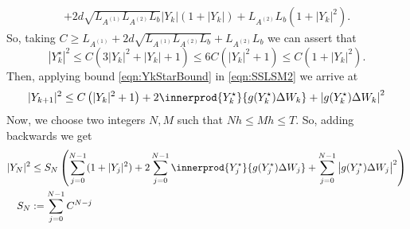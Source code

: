 \begin{pf}
\begin{align*}
			+ 2 d \sqrt{L_{A^{(1)}} L_{A^{(2)}} L_b }|Y_k|(1+|Y_k|)
			+L_{A^{(2)}} L_b (1+|Y_k|^2).
	\end{align*}
	So, taking $C \geq L_{A^{(1)}}+ 2 d \sqrt{L_{A^{(1)}} L_{A^{(2)}} L_b} + L_{A^{(2)}} L_b$ we can assert 
	that
	\begin{equation}\label{eqn:YkStarBound}
		|Y^{\star}_k|^2
			\leq 
				C(3|Y_k|^2+|Y_k| + 1) 
			\leq 
				6C\left(
					|Y_k|^2+1
				\right)
			\leq C(1+|Y_k|^2).
	\end{equation} 
	Then, applying bound \eqref{eqn:YkStarBound} in \cref{eqn:SSLSM2} we arrive at
	\begin{equation*}
		|Y_{k+1}|^2
		\leq
			C \left(
				|Y_k|^2 + 1
			\right)
			+ 2\innerprod{Y^{\star}_k}{g(Y^{\star}_k) \Delta W_k}
			+ \left|g(Y^{\star}_k) \Delta W_k \right|^2
	\end{equation*}
	Now, we choose two integers $N,M$ such that $Nh\leq Mh \leq T$. So, adding backwards we get
	\begin{align*}
		|Y_N|^2
			&\leq
			S_N\left(
				\sum_{j=0}^{N-1}
					(1+|Y_j|^2)
				+
				2\sum_{j=0}^{N-1}
					\innerprod{Y_j^{\star}}{g(Y_j^{\star}) \Delta W_j}
				+
				\sum_{j=0}^{N-1}
					\left|
						g(Y_j^{\star}) \Delta W_j
					\right|^2
			\right)\\
			S_N
				&:=
				\sum_{j=0}^{N-1}
					C^{N-j} 			
	\end{align*}


\end{pf}
